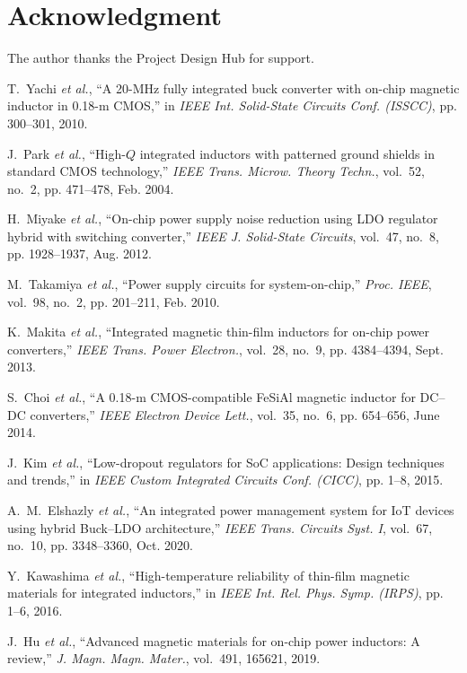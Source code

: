 \documentclass[journal]{IEEEtran}
\begin{document}
\section*{Acknowledgment}
The author thanks the Project Design Hub for support.

\begin{thebibliography}{10}

T.~Yachi \emph{et al.}, ``A 20-MHz fully integrated buck converter with on-chip magnetic inductor in 0.18-\textmu m CMOS,'' in \emph{IEEE Int. Solid-State Circuits Conf. (ISSCC)}, pp. 300--301, 2010.

J.~Park \emph{et al.}, ``High-$Q$ integrated inductors with patterned ground shields in standard CMOS technology,'' \emph{IEEE Trans. Microw. Theory Techn.}, vol.~52, no.~2, pp. 471--478, Feb. 2004.

H.~Miyake \emph{et al.}, ``On-chip power supply noise reduction using LDO regulator hybrid with switching converter,'' \emph{IEEE J. Solid-State Circuits}, vol.~47, no.~8, pp. 1928--1937, Aug. 2012.

M.~Takamiya \emph{et al.}, ``Power supply circuits for system-on-chip,'' \emph{Proc. IEEE}, vol.~98, no.~2, pp. 201--211, Feb. 2010.

K.~Makita \emph{et al.}, ``Integrated magnetic thin-film inductors for on-chip power converters,'' \emph{IEEE Trans. Power Electron.}, vol.~28, no.~9, pp. 4384--4394, Sept. 2013.

S.~Choi \emph{et al.}, ``A 0.18-\textmu m CMOS-compatible FeSiAl magnetic inductor for DC--DC converters,'' \emph{IEEE Electron Device Lett.}, vol.~35, no.~6, pp. 654--656, June 2014.

J.~Kim \emph{et al.}, ``Low-dropout regulators for SoC applications: Design techniques and trends,'' in \emph{IEEE Custom Integrated Circuits Conf. (CICC)}, pp. 1--8, 2015.

A.~M.~Elshazly \emph{et al.}, ``An integrated power management system for IoT devices using hybrid Buck--LDO architecture,'' \emph{IEEE Trans. Circuits Syst. I}, vol.~67, no.~10, pp. 3348--3360, Oct. 2020.

Y.~Kawashima \emph{et al.}, ``High-temperature reliability of thin-film magnetic materials for integrated inductors,'' in \emph{IEEE Int. Rel. Phys. Symp. (IRPS)}, pp. 1--6, 2016.

J.~Hu \emph{et al.}, ``Advanced magnetic materials for on-chip power inductors: A review,'' \emph{J. Magn. Magn. Mater.}, vol.~491, 165621, 2019.
\end{thebibliography}
\end{document}
